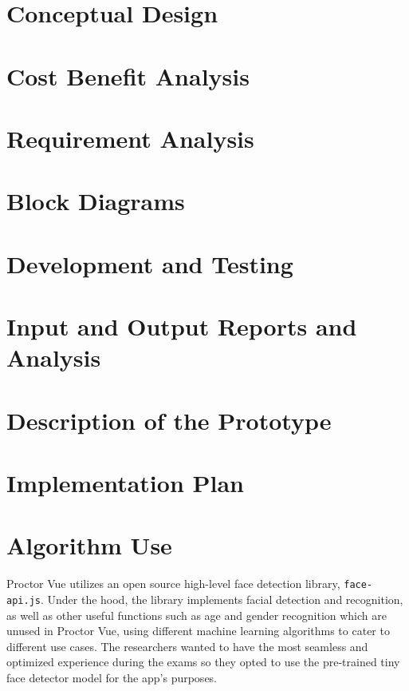 \section{Conceptual Design}

\section{Cost Benefit Analysis}

\section{Requirement Analysis}

\section{Block Diagrams}

\section{Development and Testing}

\section{Input and Output Reports and Analysis}

\section{Description of the Prototype}

\section{Implementation Plan}

\section{Algorithm Use}

Proctor Vue utilizes an open source high-level face detection library, \lstinline{face-api.js}.
Under the hood, the library implements facial detection and recognition, as well as other useful functions such as age and gender recognition which are unused in Proctor Vue, using different machine learning algorithms to cater to different use cases.
The researchers wanted to have the most seamless and optimized experience during the exams so they opted to use the pre-trained tiny face detector model for the app's purposes.

